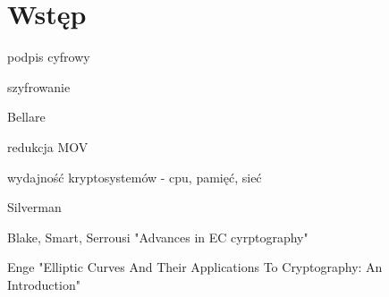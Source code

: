 \chapter*{Wstęp}


podpis cyfrowy

szyfrowanie

Bellare

redukcja MOV

wydajność kryptosystemów - cpu, pamięć, sieć

Silverman

Blake, Smart, Serrousi "Advances in EC cyrptography"

Enge "Elliptic Curves And Their Applications To Cryptography: An Introduction"

